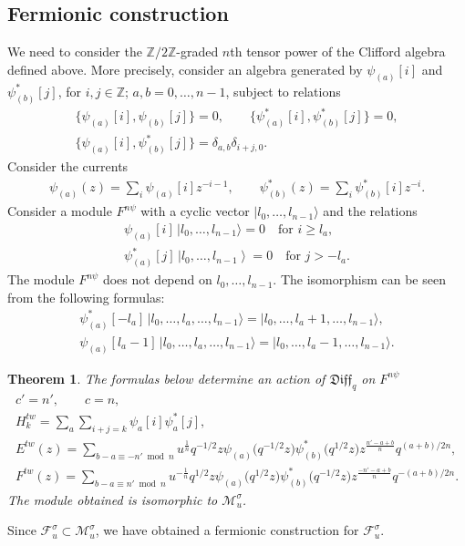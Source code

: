 \documentclass[pdftex]{sigma}
\numberwithin{equation}{section}
\newtheorem{Theorem}{Theorem}[section]
\theoremstyle{definition}
\newcommand{\qD}{\mathfrak{Diff}_q}
\newcommand{\psia}{\psi_{({a})}}
\newcommand{\psiaa}{\psi^*_{( \! a \! )}}
\newcommand{\psib}{\psi^*_{( b )}}
\newcommand{\psibb}{\psi_{( b )}}
\begin{document}
\subsection{Fermionic construction} \label{section: The Fermionic Th}

We need to consider the $\mathbb{Z}/2 \mathbb{Z}$-graded $n$th tensor power of the Clifford algebra defined above. More precisely, consider an algebra generated by $\psia [i]$ and $\psib [j]$, for $i,j \in \mathbb{Z}$; $a,b=0, \dots , n-1$, subject to relations
\begin{gather} \label{eq:nClifford1}
\big\{ \psia[i], \psibb[j] \big\} =0, \qquad \big\{ \psiaa [i], \psib[j] \big\} =0, \\ \big\{ \psia [i] , \psib [j] \big\} = \delta_{a,b} \delta_{i+j, 0}. \label{eq:nClifford2}
\end{gather}
Consider the currents
\begin{gather*}
\psia (z) = \sum_{i} \psia [i] z^{-i-1}, \qquad \psib(z) = \sum_i \psib[i] z^{-i}. \label{eq:nFermions}
\end{gather*}
Consider a module $F^{n\psi}$ with a cyclic vector $|l_0, \dots, l_{n-1} \rangle$ and the relations
\begin{gather*}
\psia [i] \, |l_0, \dots, l_{n-1} \rangle = 0 \quad \text{for } i \geqslant l_a, \\ \psiaa [j] \, \left|l_0, \dots, l_{n-1} \right\rangle = 0 \quad \text{for } j > -l_a.
\end{gather*}
The module $F^{n\psi}$ does not depend on $l_0, \dots, l_{n-1}$. The isomorphism can be seen from the following formulas:
\begin{gather*}
\psiaa [ -l_a ] \, |l_0, \dots, l_a, \dots, l_{n-1} \rangle = | l_0, \dots, l_a+1, \dots , l_{n-1} \rangle, \\
\psia [ l_a-1 ] \, |l_0, \dots, l_a, \dots , l_{n-1} \rangle = |l_0, \dots, l_a-1, \dots , l_{n-1} \rangle.
\end{gather*}

\begin{Theorem}\label{TheFermionicTh}
The formulas below determine an action of $\qD$ on $F^{n\psi}$
\begin{gather}
c' = n', \qquad c=n,\nonumber\\
H^{tw}_k = \sum_{a} \sum_{i+j=k} \psi_a [i] \psi^*_a [j] , \nonumber\\
E^{tw}(z) = \sum_{b-a \equiv -n' \bmod n} u^{\frac{1}{n}} q^{-1/2} z \psia \big( q^{-1/2} z\big) \psib \big(q^{1/2} z\big) z^{\frac{n'-a+b}{n}} q^{(a+b)/2n}, \label{eq:EtwFermi} \\
F^{tw}(z) = \sum_{b-a \equiv n' \bmod n} u^{-\frac{1}{n}} q^{1/2} z \psia \big( q^{1/2} z\big) \psib \big(q^{-1/2} z\big) z^{\frac{-n'-a+b}{n}} q^{-(a+b)/2n}. \nonumber %
\end{gather}
The module obtained is isomorphic to $\mathcal{M}_u^{\sigma}$.
\end{Theorem}
Since $\mathcal{F}_u^{\sigma} \subset \mathcal{M}_u^{\sigma}$, we have obtained a fermionic construction for $\mathcal{F}_u^{\sigma}$.
\end{document}
